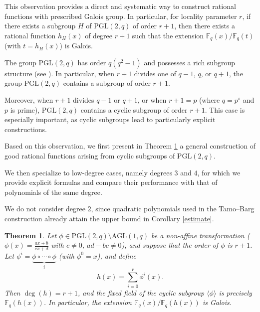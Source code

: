 \documentclass[1p,final]{elsarticle}
\newtheorem{theorem}{Theorem}[section]
\newtheorem{open problem}[theorem]{Open Problem}
\begin{document}
\medskip

This observation provides a direct and systematic way to construct rational functions with prescribed Galois group. In particular, for locality parameter $r$, if there exists a subgroup $H$ of $\mathrm{PGL}(2, q)$ of order $r+1$, then there exists a rational function $h_H(x)$ of degree $r+1$ such that the extension $\mathbb{F}_{q}(x)/\mathbb{F}_{q}(t)$ (with $t=h_H(x)$) is Galois.

\medskip

The group $\mathrm{PGL}(2, q)$ has order $q(q^2-1)$ and possesses a rich subgroup structure (see \cite{Dickson1958, Leemans 2009}). In particular, when $r+1$ divides one of $q-1$, $q$, or $q+1$, the group $\mathrm{PGL}(2, q)$ contains a subgroup of order $r+1$.

\medskip

Moreover, when $r+1$ divides $q-1$ or $q+1$, or when $r+1=p$ (where $q=p^s$ and $p$ is prime), $\mathrm{PGL}(2, q)$ contains a cyclic subgroup of order $r+1$. This case is especially important, as cyclic subgroups lead to particularly explicit constructions.

\medskip

Based on this observation, we first present in Theorem \ref{gen con} a general construction of good rational functions arising from cyclic subgroups of $\mathrm{PGL}(2, q)$. 

\medskip

We then specialize to low-degree cases, namely degrees $3$ and $4$, for which we provide explicit formulas and compare their performance with that of polynomials of the same degree.

\medskip

We do not consider degree $2$, since quadratic polynomials used in the Tamo--Barg construction already attain the upper bound in Corollary \ref{estimate}.


\begin{theorem}\setcounter{case}{0} \label{gen con}
Let $\phi \in \mathrm{PGL}(2,q)\setminus \mathrm{AGL}(1,q)$ be a non-affine transformation ($\phi(x) = \displaystyle\frac{ax+b}{cx+d}$ with $c \neq 0$, $ad-bc\ne 0$), and suppose that the order of $\phi$ is $r+1$. Let $\phi^{i}=\underbrace{\phi \circ\cdots \circ \phi}_{i}$ (with $\phi^{0}=x$), and define
\[
h(x)=\sum_{i=0}^{r}\phi^{i}(x).
\]
Then $\deg(h)=r+1$, and the fixed field of the cyclic subgroup $\langle \phi \rangle$ is precisely $\mathbb{F}_{q}(h(x))$. In particular, the extension $\mathbb{F}_{q}(x)/\mathbb{F}_{q}(h(x))$ is Galois.
\end{theorem}
\end{document}
